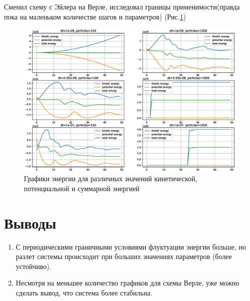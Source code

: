 \documentclass[a4paper, 12pt]{report}
\renewcommand{\figurename}{Рис.}
\begin{document}
	Сменил схему с Эйлера на Верле, исследовал границы применимости(правда пока на маленьком количестве шагов и параметров) (\figurename \ref{fig:verlet})

	\begin{figure}[h]
		\includegraphics[width=0.9\linewidth]{big_plot50(periodical).eps}
		\caption{Графики энергии для различных значений кинетической, потенциальной и суммарной энергией}
		\label{fig:verlet}
	\end{figure}

	\section{Выводы}
	\begin{enumerate}
		\item С периодическими граничными условиями флуктуации энергии больше, но разлет системы происходит при больших значениях параметров (более устойчиво).
		\item Несмотря на меньшее количество графиков для схемы Верле, уже можно сделать вывод, что система более стабильна. 
	\end{enumerate}
\end{document}
